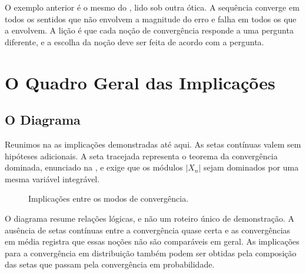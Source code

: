 \documentclass[12pt,portuguese]{article}
\theoremstyle{definition}
\theoremstyle{plainexercise}
\theoremstyle{starredexercise}
\theoremstyle{definition}
\begin{document}
O exemplo anterior é o mesmo do , lido sob outra ótica. A
sequência converge em todos os sentidos que não envolvem a magnitude do erro e
falha em todos os que a envolvem. A lição é que cada noção de convergência
responde a uma pergunta diferente, e a escolha da noção deve ser feita de acordo
com a pergunta.

\section{O Quadro Geral das Implicações}\label{sec:quadro}

\subsection{O Diagrama}\label{subsec:diagrama}

Reunimos na  as implicações demonstradas até aqui. As
setas contínuas valem sem hipóteses adicionais. A seta tracejada representa o
teorema da convergência dominada, enunciado na , e exige
que os módulos $|X_n|$ sejam dominados por uma mesma variável integrável.

\begin{figure}[H]
\centering
{}
\caption{Implicações entre os modos de convergência.}
\label{fig:implicacoes}
\end{figure}

O diagrama resume relações lógicas, e não um roteiro único de demonstração. A
ausência de setas contínuas entre a convergência quase certa e as convergências
em média registra que essas noções não são comparáveis em geral. As implicações
para a convergência em distribuição também podem ser obtidas pela composição
das setas que passam pela convergência em probabilidade.
\end{document}
